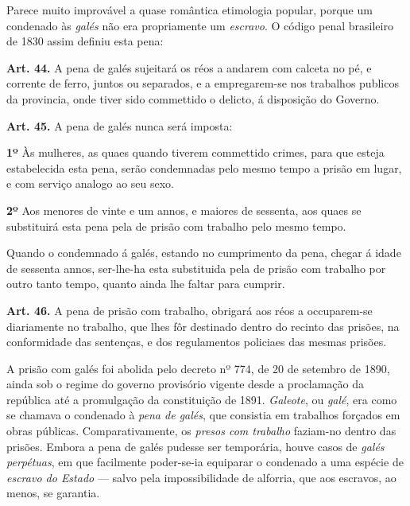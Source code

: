 Parece muito improvável a quase romântica etimologia popular, porque um condenado às \textit{galés} não era propriamente um \textit{escravo}. O código penal brasileiro de 1830 assim definiu esta pena:

\begin{citacao}
\textbf{Art. 44.} A pena de galés sujeitará os réos a andarem com calceta no pé, e corrente de ferro, juntos ou separados, e a empregarem-se nos trabalhos publicos da provincia, onde tiver sido commettido o delicto, á disposição do Governo.

\textbf{Art. 45.} A pena de galés nunca será imposta:

\textbf{1º} Às mulheres, as quaes quando tiverem commettido crimes, para que esteja estabelecida esta pena, serão condemnadas pelo mesmo tempo a prisão em lugar, e com serviço analogo ao seu sexo.

\textbf{2º} Aos menores de vinte e um annos, e maiores de sessenta, aos quaes se substituirá esta pena pela de prisão com trabalho pelo mesmo tempo.

Quando o condemnado á galés, estando no cumprimento da pena, chegar á idade de sessenta annos, ser-lhe-ha esta substituida pela de prisão com trabalho por outro tanto tempo, quanto ainda lhe faltar para cumprir.

\textbf{Art. 46.} A pena de prisão com trabalho, obrigará aos réos a occuparem-se diariamente no trabalho, que lhes fôr destinado dentro do recinto das prisões, na conformidade das sentenças, e dos regulamentos policiaes das mesmas prisões. 
\end{citacao}

A prisão com galés foi abolida pelo decreto nº 774, de 20 de setembro de 1890, ainda sob o regime do governo provisório vigente desde a proclamação da república até a promulgação da constituição de 1891. \textit{Galeote}, ou \textit{galé}, era como se chamava o condenado à \textit{pena de galés}, que consistia em trabalhos forçados em obras públicas. Comparativamente, os \textit{presos com trabalho} faziam-no dentro das prisões. Embora a pena de galés pudesse ser temporária, houve casos de \textit{galés perpétuas}, em que facilmente poder-se-ia equiparar o condenado a uma espécie de \textit{escravo do Estado} --- salvo pela impossibilidade de alforria, que aos escravos, ao menos, se garantia.

